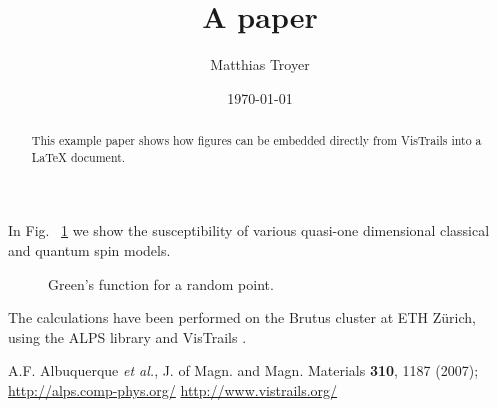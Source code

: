 \documentclass[prl, superscriptaddress, showpacs, twocolumn]{revtex4}
\begin{document}
\title{A paper}
\author{Matthias Troyer}
\date{\today}

\begin{abstract}
This example paper shows how figures can be embedded directly from VisTrails into a LaTeX document.
\end{abstract}


\hyphenation{}

\maketitle

In Fig. ~\ref{green} we show the susceptibility of various quasi-one dimensional classical and quantum spin models.

\begin{figure}[h!]
\begin{center}
\caption{Green's function for a random point.}
\label{green}
\end{center}
\end{figure}


\acknowledgments

The calculations have been performed on the Brutus  cluster at ETH Z{\"u}rich, using the ALPS library \cite{ALPS} and VisTrails  \cite{VisTrails} .

\begin{thebibliography}{9}
 A.F. Albuquerque {\it et al.}, J. of Magn. and Magn. Materials {\bf 310}, 1187 (2007); \url{http://alps.comp-phys.org/}
  \url{http://www.vistrails.org/}
\end{thebibliography}
\end{document}
